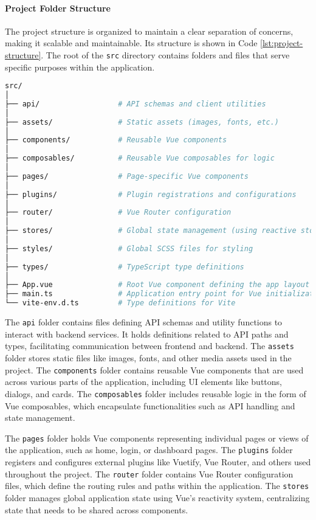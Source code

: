 \paragraph{Project Folder Structure}

The project structure is organized to maintain a clear separation of concerns, making it scalable and maintainable. Its
structure is shown in Code \ref{lst:project-structure}. The root of the \texttt{src}
directory contains folders and files that serve specific purposes within the application.

\begin{lstlisting}[language=bash, caption={Project Structure}, label={lst:project-structure}]
src/
│
├── api/                  # API schemas and client utilities
│
├── assets/               # Static assets (images, fonts, etc.)
│
├── components/           # Reusable Vue components
│
├── composables/          # Reusable Vue composables for logic
│
├── pages/                # Page-specific Vue components
│
├── plugins/              # Plugin registrations and configurations
│
├── router/               # Vue Router configuration
│
├── stores/               # Global state management (using reactive stores)
│
├── styles/               # Global SCSS files for styling
│
├── types/                # TypeScript type definitions
│
├── App.vue               # Root Vue component defining the app layout
├── main.ts               # Application entry point for Vue initialization
└── vite-env.d.ts         # Type definitions for Vite
\end{lstlisting}

The \texttt{api}
folder contains files defining API schemas and utility functions to interact with backend services. It holds definitions
related to API paths and types, facilitating communication between frontend and backend. The \texttt{assets}
folder stores static files like images, fonts, and other media assets used in the project. The \texttt{components}
folder contains reusable Vue components that are used across various parts of the application, including UI elements
like buttons, dialogs, and cards. The \texttt{composables}
folder includes reusable logic in the form of Vue composables, which encapsulate functionalities such as API handling
and state management.

The \texttt{pages}
folder holds Vue components representing individual pages or views of the application, such as home, login, or dashboard
pages. The \texttt{plugins}
folder registers and configures external plugins like Vuetify, Vue Router, and others used throughout the project. The
\texttt{router}
folder contains Vue Router configuration files, which define the routing rules and paths within the application. The
\texttt{stores}
folder manages global application state using Vue’s reactivity system, centralizing state that needs to be shared across
components.

